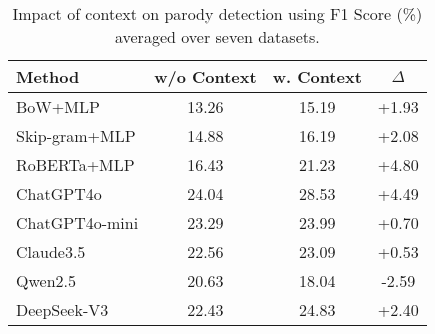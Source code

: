 \begin{table}[h]
\small
\centering
\begin{tabular}{lccc}
\toprule
\textbf{Method} & \textbf{w/o Context} & \textbf{w. Context} & \textbf{$\Delta$} \\ 
\midrule
BoW+MLP & 13.26 & 15.19 & \textcolor{increase}{+1.93} \\
Skip-gram+MLP & 14.88 & 16.19 & \textcolor{increase}{+2.08} \\
RoBERTa+MLP & 16.43 & 21.23 & \textcolor{increase}{+4.80} \\
ChatGPT4o & 24.04 & 28.53 & \textcolor{increase}{+4.49} \\
ChatGPT4o-mini & 23.29 & 23.99 & \textcolor{increase}{+0.70} \\
Claude3.5 & 22.56 & 23.09 & \textcolor{increase}{+0.53} \\
Qwen2.5 & 20.63 & 18.04 & \textcolor{decrease}{-2.59} \\
DeepSeek-V3 & 22.43 & 24.83 & \textcolor{increase}{+2.40} \\
\bottomrule
\end{tabular}
\caption{Impact of context on parody detection using F1 Score (\%) averaged over seven datasets.}\vspace{-0.4cm}
\label{tab:impact_context}
\end{table}